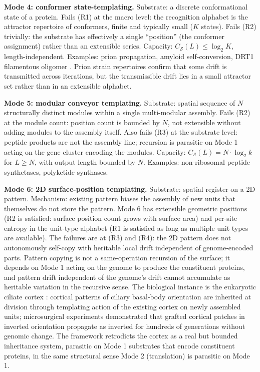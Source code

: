 \documentclass[aps,prx,reprint,amsmath,amssymb,floatfix,superscriptaddress,nofootinbib]{revtex4-2}
\theoremstyle{plain-thm}
\theoremstyle{definition-thm}
\newcommand{\Csub}{C_{\mathcal{S}}}
\begin{document}
\textbf{Mode 4: conformer state-templating.} Substrate: a discrete conformational state of a protein. Fails (R1) at the macro level: the recognition alphabet is the attractor repertoire of conformers, finite and typically small ($K$ states). Fails (R2) trivially: the substrate has effectively a single ``position'' (the conformer assignment) rather than an extensible series. Capacity: $\Csub(L) \le \log_2 K$, length-independent. Examples: prion propagation, amyloid self-conversion, DRT1 filamentous oligomer \citep{DRT1preprint2026}. Prion strain repertoires confirm that some drift is transmitted across iterations, but the transmissible drift lies in a small attractor set rather than in an extensible alphabet.

\textbf{Mode 5: modular conveyor templating.} Substrate: spatial sequence of $N$ structurally distinct modules within a single multi-modular assembly. Fails (R2) at the module count: position count is bounded by $N$, not extensible without adding modules to the assembly itself. Also fails (R3) at the substrate level: peptide products are not the assembly line; recursion is parasitic on Mode 1 acting on the gene cluster encoding the modules. Capacity: $\Csub(L) = N \cdot \log_2 k$ for $L \ge N$, with output length bounded by $N$. Examples: non-ribosomal peptide synthetases, polyketide synthases.

\textbf{Mode 6: 2D surface-position templating.} Substrate: spatial register on a 2D pattern. Mechanism: existing pattern biases the assembly of new units that themselves do not store the pattern. Mode 6 has extensible geometric positions (R2 is satisfied: surface position count grows with surface area) and per-site entropy in the unit-type alphabet (R1 is satisfied as long as multiple unit types are available). The failures are at (R3) and (R4): the 2D pattern does not autonomously self-copy with heritable local drift independent of genome-encoded parts. Pattern copying is not a same-operation recursion of the surface; it depends on Mode 1 acting on the genome to produce the constituent proteins, and pattern drift independent of the genome's drift cannot accumulate as heritable variation in the recursive sense. The biological instance is the eukaryotic ciliate cortex \citep{BeissonSonneborn1965, Frankel1989}: cortical patterns of ciliary basal-body orientation are inherited at division through templating action of the existing cortex on newly assembled units; microsurgical experiments demonstrated that grafted cortical patches in inverted orientation propagate as inverted for hundreds of generations without genomic change. The framework retrodicts the cortex as a real but bounded inheritance system, parasitic on Mode 1 substrates that encode constituent proteins, in the same structural sense Mode 2 (translation) is parasitic on Mode 1.
\end{document}
